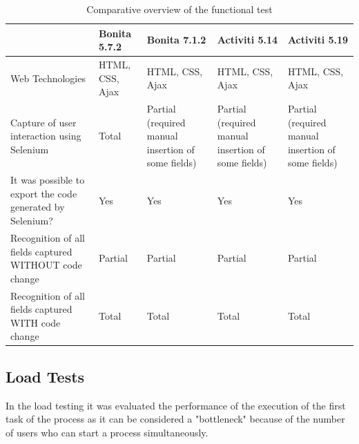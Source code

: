 \documentclass[runningheads,a4paper]{llncs}
\begin{document}
\begin{table}
\centering
\begin{center}
\begin{tabular}{p{3cm}|p{2cm}|p{2.5cm}|p{2.5cm}|p{2.5cm}}
\hline
 & Bonita 5.7.2 & Bonita 7.1.2 & Activiti 5.14 & Activiti 5.19 \\\hline
Web Technologies & HTML, CSS, Ajax & HTML, CSS, Ajax & HTML, CSS, Ajax & HTML, CSS, Ajax \\\hline
Capture of user interaction using Selenium & Total & Partial (required manual insertion of some fields) & Partial (required manual insertion of some fields) & Partial (required manual insertion of some fields) \\\hline
It was possible to export the code generated by Selenium? & Yes & Yes & Yes & Yes\\\hline
Recognition of all fields captured WITHOUT code change & Partial & Partial & Partial & Partial \\\hline
Recognition of all fields captured WITH code change & Total & Total & Total & Total \\\hline
\end{tabular}
\caption{Comparative overview of the functional test}
\label{tab:testeFuncional}
\end{center}
\end{table}


\subsection{Load Tests}

In the load testing it was evaluated the performance of the execution of the first task of the process as it can be considered a "bottleneck" because of the number of users who can start a process simultaneously.

\end{document}
